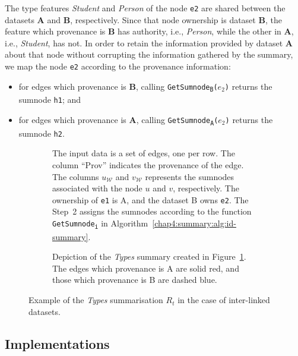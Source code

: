 The type features \emph{Student} and \emph{Person} of the node \texttt{e2} are shared between the datasets \textbf{A} and \textbf{B}, respectively. Since that node ownership is dataset \textbf{B}, the feature which provenance is \textbf{B} has authority, i.e., \emph{Person}, while the other in \textbf{A}, i.e., \emph{Student}, has not. In order to retain the information provided by dataset \textbf{A} about that node without corrupting the information gathered by the summary, we map the node \texttt{e2} according to the provenance information:
\begin{itemize}
\item for edges which provenance is \textbf{B}, calling \texttt{GetSumnode\textsubscript{B}($e_2$)} returns the sumnode \texttt{h1}; and
\item for edges which provenance is \textbf{A}, calling \texttt{GetSumnode\textsubscript{A}($e_2$)} returns the sumnode \texttt{h2}.
\end{itemize}

\begin{figure}
	\centering
	\begin{subfigure}{\textwidth}
		\centering
		\resizebox{\textwidth}{!}{
			
		}
		\caption{The input data is a set of edges, one per row. The column ``Prov'' indicates the provenance of the edge. The columns $u_\mathcal{W}$ and $v_\mathcal{W}$ represents the sumnodes associated with the node $u$ and $v$, respectively. The ownership of \texttt{e1} is A, and the dataset B owns \texttt{e2}. The Step~2 assigns the sumnodes according to the function \texttt{GetSumnode\textsubscript{i}} in Algorithm~\ref{chap4:summary:alg:id-summary}.}
		\label{tab:id-algo-ex}
	\end{subfigure}
	\quad
	\begin{subfigure}{.8\textwidth}
		\centering
		\resizebox{.8\textwidth}{!}{
			
		}
		\caption{Depiction of the \emph{Types} summary created in Figure~\ref{tab:id-algo-ex}. The edges which provenance is A are solid red, and those which provenance is B are dashed blue.}
		\label{fig:id-algo-ex}
	\end{subfigure}
	\caption{Example of the \emph{Types} summarisation $R_t$ in the case of inter-linked datasets.}
\end{figure}

\subsection{Implementations}
\label{sec:summary-impl}

